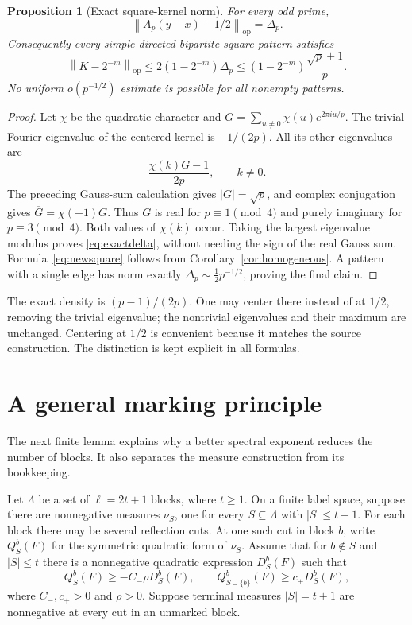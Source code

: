 \documentclass[11pt,a4paper]{article}
\numberwithin{equation}{section}
\newtheorem{proposition}[theorem]{Proposition}
\theoremstyle{definition}
\theoremstyle{remark}
\newcommand{\op}{\mathrm{op}}
\newcommand{\norm}[1]{\left\lVert #1\right\rVert}
\begin{document}
\begin{proposition}[Exact square-kernel norm]
\label{prop:exactsquare}
For every odd prime,
\[
 \norm{A_p(y-x)-1/2}_{\op}=\Delta_p.
\]
Consequently every simple directed bipartite square pattern satisfies
\begin{equation}
 \norm{K-2^{-m}}_{\op}
 \le2(1-2^{-m})\Delta_p
 \le(1-2^{-m})\frac{\sqrt p+1}{p}.
 \label{eq:newsquare}
\end{equation}
No uniform $o(p^{-1/2})$ estimate is possible for all nonempty patterns.
\end{proposition}
\begin{proof}
Let $\chi$ be the quadratic character and
$G=\sum_{u\ne0}\chi(u)e^{2\pi iu/p}$. The trivial Fourier eigenvalue
of the centered kernel is $-1/(2p)$. All its other eigenvalues are
\[
 \frac{\chi(k)G-1}{2p},\qquad k\ne0.
\]
The preceding Gauss-sum calculation gives $|G|=\sqrt p$, and complex
conjugation gives $\overline G=\chi(-1)G$. Thus $G$ is real for
$p\equiv1\pmod4$ and purely imaginary for $p\equiv3\pmod4$.
Both values of $\chi(k)$ occur. Taking the largest eigenvalue modulus
proves \eqref{eq:exactdelta}, without needing the sign of the real
Gauss sum. Formula~\eqref{eq:newsquare} follows from
Corollary~\ref{cor:homogeneous}. A pattern with a single edge has
norm exactly $\Delta_p\sim\tfrac12p^{-1/2}$, proving the final claim.
\end{proof}

The exact density is $(p-1)/(2p)$. One may center there instead of at
$1/2$, removing the trivial eigenvalue; the nontrivial eigenvalues and
their maximum are unchanged. Centering at $1/2$ is convenient because
it matches the source construction. The distinction is kept explicit
in all formulas.

\section{A general marking principle}
\label{sec:marking}

The next finite lemma explains why a better spectral exponent reduces
the number of blocks. It also separates the measure construction from
its bookkeeping.

Let $\Lambda$ be a set of $\ell=2t+1$ blocks, where $t\ge1$.
On a finite label space, suppose there are nonnegative measures
$\nu_S$, one for every $S\subseteq\Lambda$ with $|S|\le t+1$.
For each block there may be several reflection cuts. At one such cut
in block $b$, write $Q_S^b(F)$ for the symmetric quadratic form of
$\nu_S$. Assume that for $b\notin S$ and $|S|\le t$ there is a
nonnegative quadratic expression $D_S^b(F)$ such that
\begin{equation}
 Q_S^b(F)\ge-C_-\rho D_S^b(F),\qquad
 Q_{S\cup\{b\}}^b(F)\ge c_+D_S^b(F),
 \label{eq:abstractdom}
\end{equation}
where $C_-,c_+>0$ and $\rho>0$. Suppose terminal measures
$|S|=t+1$ are nonnegative at every cut in an unmarked block.
\end{document}
